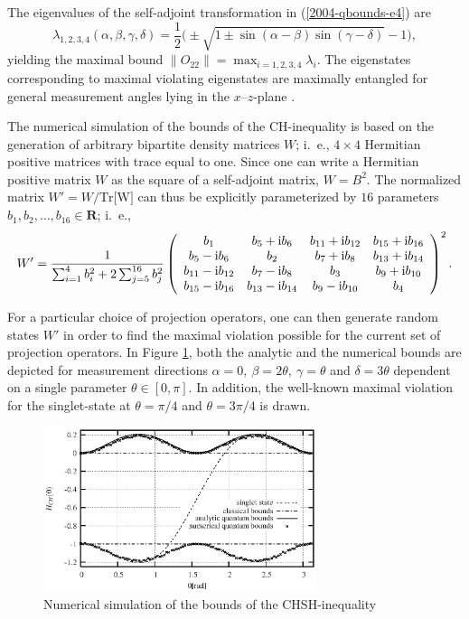 \documentclass[pra,amsmath,amsfonts,showkeys,showpacs,preprint]{revtex4}
\begin{document}
The eigenvalues of the self-adjoint transformation in
(\ref{2004-qbounds-e4}) are
\begin{equation}
  \label{eq:2004-qbounds-evo22}
  \lambda_{1,2,3,4}(\alpha,\beta,\gamma,\delta )
=
\frac{1}{2}\big(\pm\sqrt{1\pm\sin(\alpha -\beta )\sin(\gamma -\delta )}-1\big),
\end{equation}
yielding the maximal bound
$\|O_{22} \|= \max_{i=1,2,3,4} \lambda_i$.
The eigenstates
corresponding to maximal violating eigenstates are maximally
entangled for general measurement angles lying in the $x$--$z$-plane  \cite{filipp-svozil04a}.


The numerical simulation of the bounds of the CH-inequality
is based
on the generation of arbitrary bipartite density matrices $W$; i.~e., $4
\times 4$ Hermitian positive matrices with trace equal to one.
Since one can write a Hermitian positive matrix $W$ as the square of a
self-adjoint matrix, $W=B^2$.
The
normalized matrix $W'=W/\mbox{Tr[W]}$ can thus be explicitly parameterized by $16$ parameters
$b_1,b_2,\ldots ,b_{16}\in {\mathbf R}$; i.~e.,
\begin{equation}
    \label{e-2003-qpoly-2}
    W'=\frac{1}{\sum_{i=1}^4 b_i^2 + 2 \sum_{j=5}^{16}
    b_j^2}\left(\begin{array}{cccc} b_1 & b_5 + {\rm i}b_6 & b_{11} +
    {\rm i}b_{12} & b_{15} + {\rm i}b_{16}\\ b_5 - {\rm i}b_6 & b_2 &
    b_7 + {\rm i}b_8 & b_{13} + {\rm i}b_{14}\\ b_{11} - {\rm i}b_{12}
    & b_7 - {\rm i}b_8 & b_3 & b_9 + {\rm i}b_{10}\\ b_{15} - {\rm
    i}b_{16} & b_{13} - {\rm i}b_{14} & b_9 - {\rm i}b_{10} &b_4
      \end{array}\right)^2 .
\end{equation}

For a particular choice of projection operators, one can then generate
random states $W'$ in order to find the maximal violation possible for the
current set of projection operators. In Figure \ref{fig:numerical}, both the
analytic and the numerical bounds are depicted for measurement directions $\alpha=0,\
\beta=2\theta,\ \gamma=\theta$ and $\delta=3\theta$ dependent on a
single parameter $\theta \in [0,\pi]$.
In addition, the well-known maximal
violation for the singlet-state at $\theta=\pi/4$ and $\theta=3\pi/4$
is drawn.
\begin{figure}[htbp]
  \centering
  \includegraphics[width=80mm]{2005-filipp-svo-tracing_chsh}
  \caption{Numerical simulation of the bounds of the CHSH-inequality}
  \label{fig:numerical}
\end{figure}
\end{document}
